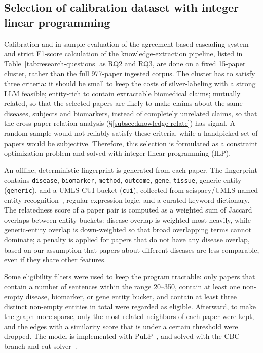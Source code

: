 \subsection{Selection of calibration dataset with integer linear programming}\label{subsec:eval-ilp}

Calibration and in-sample evaluation of the agreement-based cascading system and strict F1-score calculation of the knowledge-extraction pipeline, listed in Table~\ref{tab:research-questions} as RQ2 and RQ3, are done on a fixed 15-paper cluster, rather than the full 977-paper ingested corpus. The cluster has to satisfy three criteria: it should be small to keep the costs of silver-labeling with a strong LLM feasible; entity-rich to contain extractable biomedical claims; mutually related, so that the selected papers are likely to make claims about the same diseases, subjects and biomarkers, instead of completely unrelated claims, so that the cross-paper relation analysis (§\ref{subsec:knowledge-relate}) has signal. A random sample would not reliably satisfy these criteria, while a handpicked set of papers would be subjective. Therefore, this selection is formulated as a constraint optimization problem and solved with integer linear programming (ILP).

An offline, deterministic fingerprint is generated from each paper. The fingerprint contains \texttt{disease}, \texttt{biomarker}, \texttt{method}, \texttt{outcome}, \texttt{gene}, \texttt{tissue}, generic-entity (\texttt{generic}), and a UMLS-CUI bucket (\texttt{cui}), collected from scispacy/UMLS named entity recognition~\parencite{neumann2019scispacy, bodenreider2004umls}, regular expression logic, and a curated keyword dictionary. The relatedness score of a paper pair is computed as a weighted sum of Jaccard overlaps between entity buckets: disease overlap is weighted most heavily, while generic-entity overlap is down-weighted so that broad overlapping terms cannot dominate; a penalty is applied for papers that do not have any disease overlap, based on our assumption that papers about different diseases are less comparable, even if they share other features.

Some eligibility filters were used to keep the program tractable: only papers that contain a number of sentences within the range 20--350, contain at least one non-empty disease, biomarker, or gene entity bucket, and contain at least three distinct non-empty entities in total were regarded as eligible. Afterward, to make the graph more sparse, only the most related neighbors of each paper were kept, and the edges with a similarity score that is under a certain threshold were dropped. The model is implemented with PuLP~\parencite{dunning2011pulplinearprogramming}, and solved with the CBC branch-and-cut solver~\parencite{forrest2019cbc}.

